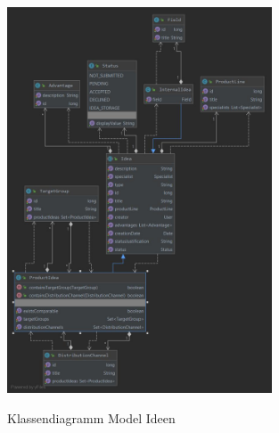 \begin{figure}[htb]
    \centering
    \begin{minipage}[H]{1\textwidth}
        \caption{Klassendiagramm Model Ideen}
        \includegraphics[width=0.7\textwidth]{img/idea-model-klassendiagramm.jpg}\\
        \label{fig:idea-model-klassendiagramm}
    \end{minipage}
\end{figure}

